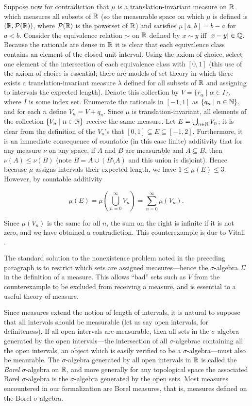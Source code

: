 \documentclass[leqno]{article}
\theoremstyle{definition}
\newcommand{\bldset}[2]{\{{#1}\mid{#2}\}}
\begin{document}
Suppose now for contradiction that $\mu$ is a translation-invariant measure on $\mathbb{R}$ which measures all subsets of $\mathbb{R}$ (so the measurable space on which $\mu$ is defined is $(\mathbb{R}, \mathcal P(\mathbb{R}))$, where $\mathcal P(\mathbb{R})$ is the powerset of $\mathbb{R}$) and satisfies $\mu [a,b] = b - a$ for $a < b$. Consider the equivalence relation $\sim$ on $\mathbb{R}$ defined by $x \sim y$ iff $|x - y| \in \mathbb{Q}$. Because the rationals are dense in $\mathbb{R}$ it is clear that each equivalence class contains an element of the closed unit interval. Using the axiom of choice, select one element of the intersection of each equivalence class with $[0,1]$ (this use of the axiom of choice is essential; there are models of set theory in which there exists a translation-invariant measure $\lambda$ defined for all subsets of $\mathbb{R}$ and assigning to intervals the expected length). Denote this collection by $V = \bldset{r_\alpha}{\alpha \in I}$, where $I$ is some index set. Enumerate the rationals in $[-1,1]$ as $\bldset{q_n}{n \in \N}$, and for each $n$ define $V_n = V + q_n$. Since $\mu$ is translation-invariant, all elements of the collection $\bldset{V_n}{n \in \N}$ receive the same measure. Let $E = \bigcup_{n \in \mathbb{N}} V_n$; it is clear from the definition of the $V_n$'s that $[0,1] \subseteq E \subseteq [-1,2]$. Furthermore, it is an immediate consequence of countable (in this case finite) additivity that for any measure $\nu$ on any space, if $A$ and $B$ are measurable and $A \subseteq B$, then $\nu(A) \le \nu(B)$ (note $B = A \cup (B \setminus A)$ and this union is disjoint). Hence because $\mu$ assigns intervals their expected length, we have $1 \le \mu(E) \le 3$. However, by countable additivity

\[ \mu(E) = \mu\left(\bigcup_{n=0}^\infty V_n\right) = \sum_{n=0}^\infty \mu(V_n). \]

Since $\mu(V_n)$ is the same for all $n$, the sum on the right is infinite if it is not zero, and we have obtained a contradiction. This counterexample is due to Vitali \cite{vitali}.

The standard solution to the nonexistence problem noted in the preceding paragraph is to restrict which sets are assigned measures---hence the $\sigma$-algebra $\Sigma$ in the definition of a measure. This allows ``bad'' sets such as $V$ from the counterexample to be excluded from receiving a measure, and is essential to a useful theory of measure.

Since measures extend the notion of length of intervals, it is natural to suppose that all intervals should be measurable (let us say open intervals, for definiteness). If all open intervals are measurable, then all sets in the $\sigma$-algebra generated by the open intervals---the intersection of all $\sigma$-algebrae containing all the open intervals, an object which is easily verified to be a $\sigma$-algebra---must also be meaurable. The $\sigma$-algebra generated by all open intervals in $\mathbb{R}$ is called the {\em Borel} $\sigma$-algebra on $\mathbb{R}$, and more generally for any topological space the associated Borel $\sigma$-algebra is the $\sigma$-algebra generated by the open sets. Most measures encountered in our formalization are Borel measures, that is, measures defined on the Borel $\sigma$-algebra.
\end{document}

